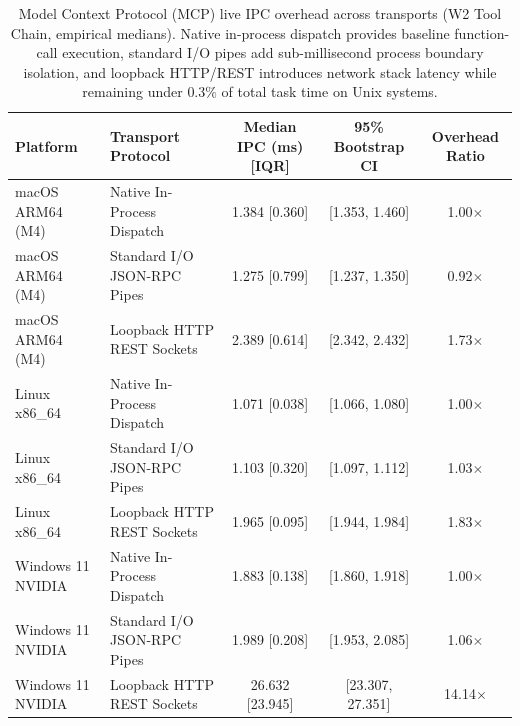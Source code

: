 \begin{table}[t]
\centering
\small
\caption{Model Context Protocol (MCP) live IPC overhead across transports (W2 Tool Chain, empirical medians). Native in-process dispatch provides baseline function-call execution, standard I/O pipes add sub-millisecond process boundary isolation, and loopback HTTP/REST introduces network stack latency while remaining under $0.3\%$ of total task time on Unix systems.}
\label{tab:mcp_transport_ablation}
\begin{tabular}{llccc}
\toprule
\textbf{Platform} & \textbf{Transport Protocol} & \textbf{Median IPC (ms) [IQR]} & \textbf{95\% Bootstrap CI} & \textbf{Overhead Ratio} \\
\midrule
macOS ARM64 (M4) & Native In-Process Dispatch & 1.384 [0.360] & [1.353, 1.460] & 1.00$\times$ \\
macOS ARM64 (M4) & Standard I/O JSON-RPC Pipes & 1.275 [0.799] & [1.237, 1.350] & 0.92$\times$ \\
macOS ARM64 (M4) & Loopback HTTP REST Sockets & 2.389 [0.614] & [2.342, 2.432] & 1.73$\times$ \\
\midrule
Linux x86\_64 & Native In-Process Dispatch & 1.071 [0.038] & [1.066, 1.080] & 1.00$\times$ \\
Linux x86\_64 & Standard I/O JSON-RPC Pipes & 1.103 [0.320] & [1.097, 1.112] & 1.03$\times$ \\
Linux x86\_64 & Loopback HTTP REST Sockets & 1.965 [0.095] & [1.944, 1.984] & 1.83$\times$ \\
\midrule
Windows 11 NVIDIA & Native In-Process Dispatch & 1.883 [0.138] & [1.860, 1.918] & 1.00$\times$ \\
Windows 11 NVIDIA & Standard I/O JSON-RPC Pipes & 1.989 [0.208] & [1.953, 2.085] & 1.06$\times$ \\
Windows 11 NVIDIA & Loopback HTTP REST Sockets & 26.632 [23.945] & [23.307, 27.351] & 14.14$\times$ \\
\midrule
\bottomrule
\end{tabular}
\end{table}
